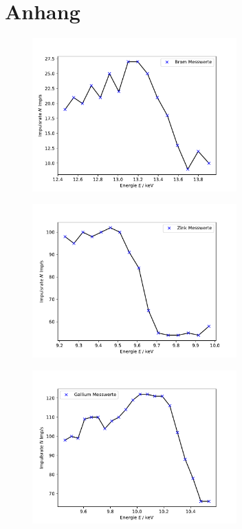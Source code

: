 \newpage
\section{Anhang}
\begin{figure}
    \centering
    \includegraphics[width=0.7\textwidth]{plots/Brom.pdf}
    \caption{}
\end{figure}
\begin{figure}
    \centering
    \includegraphics[width=0.7\textwidth]{plots/Zink.pdf}
    \caption{}
\end{figure}
\begin{figure}
    \centering
    \includegraphics[width=0.7\textwidth]{plots/Gallium.pdf}
    \caption{}
\end{figure}
